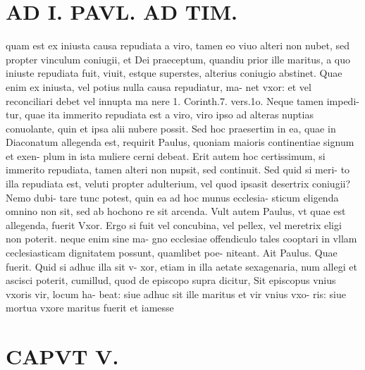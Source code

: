 \documentclass{article}
\begin{document}
\begin{pages}
\section*{AD I. PAVL. AD TIM. }
\marginpar{[ p.276 ]}\pstart quam est ex iniusta causa repudiata a viro, tamen eo viuo alteri non nubet, sed propter vinculum coniugii, et Dei praeceptum, quandiu prior ille maritus, a quo iniuste repudiata fuit, viuit, estque superstes, alterius coniugio abstinet. Quae enim ex iniusta, vel potius nulla causa repudiatur, ma- net vxor: et vel reconciliari debet vel innupta ma nere 1. Corinth.7. vers.1o. Neque tamen impedi- tur, quae ita immerito repudiata est a viro, viro ipso ad alteras nuptias conuolante, quin et ipsa alii nubere possit. Sed hoc praesertim in ea, quae in Diaconatum allegenda est, requirit Paulus, quoniam maioris continentiae signum et exen- plum in ista muliere cerni debeat. Erit autem hoc certissimum, si immerito repudiata, tamen alteri non nupsit, sed continuit. Sed quid si meri- to illa repudiata est, veluti propter adulterium, vel quod ipsasit desertrix coniugii? Nemo dubi- tare tunc potest, quin ea ad hoc munus ecclesia- sticum eligenda omnino non sit, sed ab hochono re sit arcenda. Vult autem Paulus, vt quae est allegenda, fuerit Vxor. Ergo si fuit vel concubina, vel pellex, vel meretrix eligi non poterit. neque enim sine ma- gno ecclesiae offendiculo tales cooptari in vllam ceclesiasticam dignitatem possunt, quamlibet poe- niteant. Ait Paulus. Quae fuerit. Quid si adhuc illa sit v- xor, etiam in illa aetate sexagenaria, num allegi et ascisci poterit, cumillud, quod de episcopo supra dicitur, Sit episcopus vnius vxoris vir, locum ha- beat: siue adhuc sit ille maritus et vir vnius vxo- ris: siue mortua vxore maritus fuerit et iamesse  \pend
\section*{CAPVT  V. }
\marginpar{[ p.2 ]}\pstart {}
{}

\end{pages}
\end{document}
